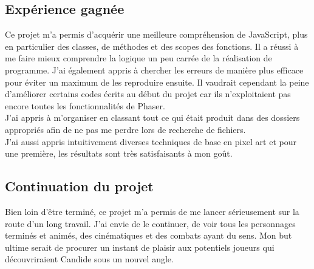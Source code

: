 \documentclass[11pt]{article}
\begin{document}
\subsection{Expérience gagnée}
Ce projet m'a permis d'acquérir une meilleure compréhension de JavaScript, plus en particulier des classes, de méthodes et des scopes des fonctions. Il a réussi à me faire mieux comprendre la logique un peu carrée de la réalisation de programme. J'ai également appris à chercher les erreurs de manière plus efficace pour éviter un maximum de les reproduire ensuite. Il vaudrait cependant la peine d'améliorer certains codes écrits au début du projet car ils n'exploitaient pas encore toutes les fonctionnalités de Phaser.\\ 

J'ai appris à m'organiser en classant tout ce qui était produit dans des dossiers appropriés afin de ne pas me perdre lors de recherche de fichiers.\\

J'ai aussi appris intuitivement diverses techniques de base en pixel art et pour une première, les résultats sont très satisfaisants à mon goût. 
\subsection{Continuation du projet}
Bien loin d'être terminé, ce projet m'a permis de me lancer sérieusement sur la route d'un long travail. J'ai envie de le continuer, de voir tous les personnages terminés et animés, des cinématiques et des combats ayant du sens. Mon but ultime serait de procurer un instant de plaisir aux potentiels joueurs qui découvriraient Candide sous un nouvel angle. 
\end{document}
